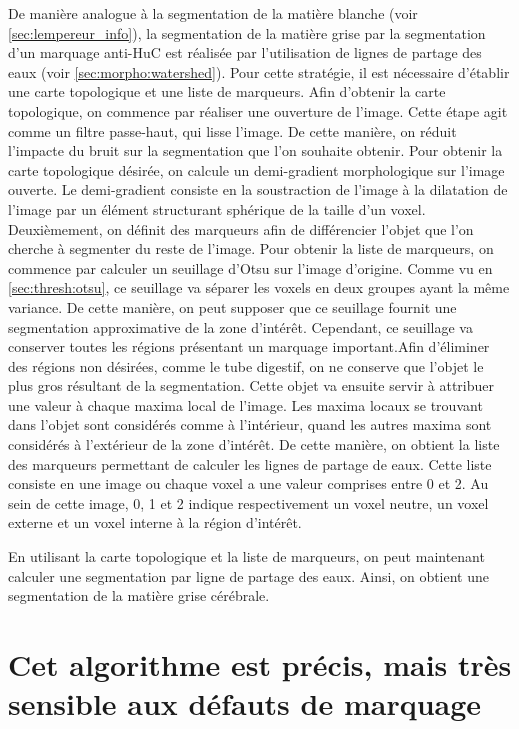 \documentclass[\main/main.tex]{subfiles}
\begin{document}
De manière analogue à la segmentation de la matière blanche (voir \autoref{sec:lempereur_info}), la segmentation de la matière grise par la segmentation d'un marquage anti-HuC est réalisée par l'utilisation de lignes de partage des eaux
(voir \autoref{sec:morpho:watershed}). Pour cette stratégie, il est nécessaire d'établir une carte topologique et une liste de marqueurs.
%
Afin d'obtenir la carte topologique, on commence par réaliser une ouverture de l'image. Cette étape agit comme un filtre passe-haut,
qui lisse l'image. De cette manière, on réduit l'impacte du bruit sur la segmentation que l'on souhaite obtenir. Pour obtenir la carte topologique désirée, on calcule un demi-gradient morphologique sur l'image ouverte. Le demi-gradient consiste en la soustraction de l'image à la dilatation de l'image par un élément structurant sphérique de la taille d'un voxel.
Deuxièmement, on définit des marqueurs afin de différencier l'objet que l'on cherche à segmenter du reste de l'image. Pour obtenir la liste de marqueurs, on commence par calculer un seuillage d'Otsu sur l'image d'origine. Comme vu en \autoref{sec:thresh:otsu}, ce seuillage va séparer les voxels en deux groupes ayant la même variance. De cette manière, on peut supposer que ce seuillage fournit une segmentation approximative de la zone d'intérêt. Cependant, ce seuillage va conserver toutes les régions présentant un marquage important.Afin d'éliminer des régions non désirées, comme le tube digestif, on ne conserve que l'objet le plus gros résultant de la segmentation.
%
Cette objet va ensuite servir à attribuer une valeur à chaque maxima local de l'image. Les maxima locaux se trouvant dans l'objet sont considérés comme à l'intérieur, quand les autres maxima sont considérés à l'extérieur de la zone d'intérêt. De cette manière, on obtient la liste des marqueurs permettant de calculer les lignes de partage de eaux. Cette liste consiste en une image ou chaque voxel a une valeur comprises entre 0 et 2. Au sein de cette image, 0, 1 et 2 indique respectivement un voxel neutre, un voxel externe et un voxel interne à la région d'intérêt. 

%
En utilisant la carte topologique et la liste de marqueurs, on peut maintenant calculer une segmentation par ligne de partage des eaux. Ainsi, on obtient une segmentation de la matière grise cérébrale.
    
    \section{Cet algorithme est précis, mais très sensible aux défauts de marquage}
    
\end{document}
